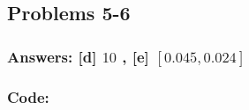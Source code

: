 \documentclass[11pt]{article}
\begin{document}
    \hypertarget{problems-5-6}{%
\subsection{Problems 5-6}\label{problems-5-6}}

\hypertarget{answers-d-10-e-0.0450.024}{%
\subsubsection{\texorpdfstring{Answers: {[}d{]} \(10\) , {[}e{]}
\([0.045,0.024]\)}{Answers: {[}d{]} 10 , {[}e{]} {[}0.045,0.024{]}}}\label{answers-d-10-e-0.0450.024}}

\hypertarget{code}{%
\subsubsection{Code:}\label{code}}
\end{document}
